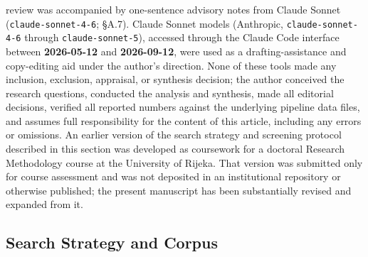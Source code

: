 review was accompanied by one-sentence advisory notes from Claude Sonnet
(\texttt{claude-sonnet-4-6}; \S A.7). Claude Sonnet models (Anthropic,
\texttt{claude-sonnet-4-6} through \texttt{claude-sonnet-5}), accessed
through the Claude Code interface between \textbf{2026-05-12} and
\textbf{2026-09-12}, were used as a drafting-assistance and copy-editing
aid under the author's direction. None of these tools made any
inclusion, exclusion, appraisal, or synthesis decision; the author conceived
the research questions, conducted the analysis and synthesis, made all
editorial decisions, verified all reported numbers against the underlying
pipeline data files, and assumes full responsibility for the content of this
article, including any errors or omissions. An earlier version of the search strategy
and screening protocol described in this section was developed as coursework
for a doctoral Research Methodology course at the University of Rijeka. That
version was submitted only for course assessment and was not deposited in an
institutional repository or otherwise published; the present manuscript has
been substantially revised and expanded from it.

\subsection{Search Strategy and Corpus}
\label{sec:methodology:search}

